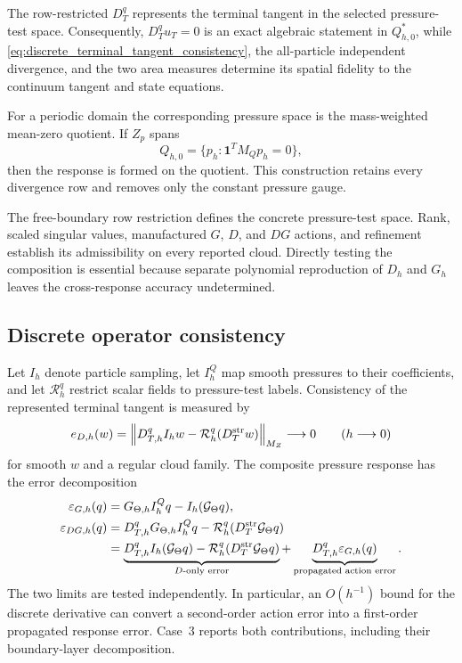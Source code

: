 \documentclass[11pt]{article}
\theoremstyle{plain}
\theoremstyle{definition}
\theoremstyle{remark}
\newcommand{\Th}{\Theta}
\newcommand{\norm}[2][]{\left\lVert #2\right\rVert_{#1}}
\begin{document}
The row-restricted $D_T^q$ represents the terminal tangent in the selected
pressure-test space.  Consequently, $D_T^qu_T=0$ is an exact algebraic
statement in $Q_{h,0}^*$, while
\eqref{eq:discrete_terminal_tangent_consistency}, the all-particle independent
divergence, and the two area measures determine its spatial fidelity to the
continuum tangent and state equations.

For a periodic domain the corresponding pressure space is the mass-weighted
mean-zero quotient.  If $Z_p$ spans
\begin{equation}
  Q_{h,0}=\{p_h:\bm 1^TM_Qp_h=0\},
  \label{eq:periodic_mean_zero_space}
\end{equation}
then the response is formed on the quotient.  This construction retains every
divergence row and removes only the constant pressure gauge.

The free-boundary row restriction defines the concrete pressure-test space.
Rank, scaled singular values, manufactured $G$, $D$, and $DG$ actions, and
refinement establish its admissibility on every reported cloud.  Directly
testing the composition is essential because separate polynomial reproduction
of $D_h$ and $G_h$ leaves the cross-response accuracy undetermined.

\subsection{Discrete operator consistency}
\label{sec:discrete_operator_consistency}

Let $I_h$ denote particle sampling, let $I_h^Q$ map smooth pressures to their
coefficients, and let $\mathcal R_h^q$ restrict scalar fields to pressure-test
labels.  Consistency of the represented terminal tangent is measured by
\begin{equation}
 e_{D,h}(w)=
 \norm[M_Z]{D_{T,h}^q I_hw-\mathcal R_h^q(D_T^{\rm str}w)}
 \longrightarrow0
 \qquad (h\longrightarrow0)
 \label{eq:discrete_terminal_tangent_consistency}
\end{equation}
for smooth $w$ and a regular cloud family.  The composite pressure response
has the error decomposition
\begin{align}
 \varepsilon_{G,h}(q)
 &=G_{\Th,h}I_h^Qq-I_h(\mathcal G_\Th q),\notag\\
 \varepsilon_{DG,h}(q)
 &=D_{T,h}^qG_{\Th,h}I_h^Qq
   -\mathcal R_h^q(D_T^{\rm str}\mathcal G_\Th q)\notag\\
 &=\underbrace{D_{T,h}^qI_h(\mathcal G_\Th q)
   -\mathcal R_h^q(D_T^{\rm str}\mathcal G_\Th q)}_{\text{$D$-only error}}
   +\underbrace{D_{T,h}^q\varepsilon_{G,h}(q)}_{\text{propagated action error}}.
 \label{eq:discrete_composite_consistency}
\end{align}
The two limits are tested independently.  In particular, an $O(h^{-1})$
bound for the discrete derivative can convert a second-order action error into
a first-order propagated response error.  Case~3 reports both contributions,
including their boundary-layer decomposition.
\end{document}
